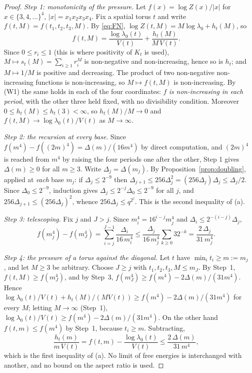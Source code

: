 \documentclass[11pt,a4paper]{article}
\theoremstyle{plain}
\theoremstyle{definition}
\theoremstyle{remark}
\numberwithin{equation}{section}
\begin{document}
\begin{proof}
\emph{Step 1: monotonicity of the pressure.} Let $f(x)=\log Z(x)/|x|$ for $x\in\{3,4,\dots\}^4$, $|x|=x_1x_2x_3x_4$. Fix a spatial torus $t$ and write $f(t,M)=f(t_1,t_2,t_3,M)$. By \eqref{eq:FN},
$\log Z(t,M)=M\log\lambda_0+h_t(M)$, so
\[
f(t,M)=\frac{\log\lambda_0(t)}{V(t)}+\frac{h_t(M)}{M\,V(t)}.
\]
Since $0\le r_i\le1$ (this is where positivity of $K_t$ is used), $M\mapsto s_t(M)=\sum_{i\ge1}r_i^M$ is non-negative and non-increasing, hence so is $h_t$; and $M\mapsto1/M$ is positive and decreasing. The product of two non-negative non-increasing functions is non-increasing, so $M\mapsto f(t,M)$ is non-increasing. By (W1) the same holds in each of the four coordinates: \emph{$f$ is non-increasing in each period}, with the other three held fixed, with no divisibility condition. Moreover $0\le h_t(M)\le h_t(3)<\infty$, so $h_t(M)/M\to0$ and $f(t,M)\to\log\lambda_0(t)/V(t)$ as $M\to\infty$.

\emph{Step 2: the recursion at every base.} Since $f(m^4)-f((2m)^4)=\Delta(m)/(16m^4)$ by direct computation, and $(2m)^4$ is reached from $m^4$ by raising the four periods one after the other, Step 1 gives $\Delta(m)\ge0$ for all $m\ge3$. Write $\Delta_j=\Delta(m_j)$. By Proposition~\ref{prop:doubling}, applied at \emph{each} base $m_j$: if $\Delta_j\le2^{-9}$ then $\Delta_{j+1}\le256\Delta_j^2=(256\Delta_j)\Delta_j\le\Delta_j/2$. Since $\Delta_0\le2^{-9}$, induction gives $\Delta_j\le2^{-j}\Delta_0\le2^{-9}$ for all $j$, and $256\Delta_{j+1}\le(256\Delta_j)^2$, whence $256\Delta_j\le q^{2^j}$. This is the second inequality of (a).

\emph{Step 3: telescoping.} Fix $j$ and $J>j$. Since $m_i^4=16^{i-j}m_j^4$ and $\Delta_i\le2^{-(i-j)}\Delta_j$,
\[
f(m_j^4)-f(m_J^4)=\sum_{i=j}^{J-1}\frac{\Delta_i}{16\,m_i^4}\le\frac{\Delta_j}{16\,m_j^4}\sum_{k\ge0}32^{-k}=\frac{2\,\Delta_j}{31\,m_j^4}.
\]

\emph{Step 4: the pressure of a torus against the diagonal.} Let $t$ have $\min_it_i\ge m:=m_j$, and let $M\ge3$ be arbitrary. Choose $J\ge j$ with $t_1,t_2,t_3,M\le m_J$. By Step~1, $f(t,M)\ge f(m_J^4)$, and by Step~3, $f(m_J^4)\ge f(m^4)-2\Delta(m)/(31m^4)$. Hence
$\log\lambda_0(t)/V(t)+h_t(M)/(MV(t))\ge f(m^4)-2\Delta(m)/(31m^4)$ for every $M$; letting $M\to\infty$ (Step~1),
$\log\lambda_0(t)/V(t)\ge f(m^4)-2\Delta(m)/(31m^4)$. On the other hand $f(t,m)\le f(m^4)$ by Step~1, because $t_i\ge m$. Subtracting,
\[
\frac{h_t(m)}{m\,V(t)}=f(t,m)-\frac{\log\lambda_0(t)}{V(t)}\le\frac{2\,\Delta(m)}{31\,m^4},
\]
which is the first inequality of (a). No limit of free energies is interchanged with another, and no bound on the aspect ratio is used.


\end{proof}
\end{document}
